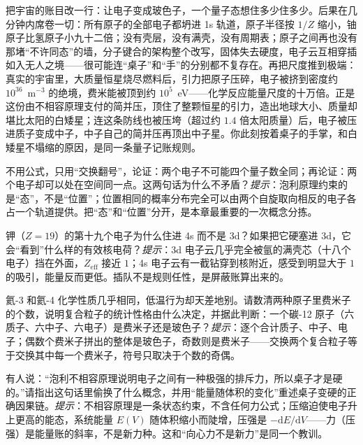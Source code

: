 
\begin{thought}[如果电子是玻色子]
把宇宙的账目改一行：让电子变成玻色子，一个量子态想住多少住多少。后果在几分钟内席卷一切：所有原子的全部电子都坍进 1s 轨道，原子半径按 \(1/Z\) 缩小，铀原子比氢原子小九十二倍；没有壳层，没有满壳，没有周期表；原子之间再也没有那堵“不许同态”的墙，分子键合的架构整个改写，固体失去硬度，电子云互相穿插如入无人之境——很可能连“桌子”和“手”的分别都不复存在。再把尺度推到极端：真实的宇宙里，大质量恒星烧尽燃料后，引力把原子压碎，电子被挤到密度约 \(10^{36}\)~m\(^{-3}\) 的绝境，费米能被顶到约 \(10^5\)~eV——化学反应能量尺度的十万倍。正是这份由不相容原理支付的简并压，顶住了整颗恒星的引力，造出地球大小、质量却堪比太阳的白矮星；连这条防线也被压垮（超过约 \(1.4\) 倍太阳质量）后，电子被压进质子变成中子，中子自己的简并压再顶出中子星。你此刻按着桌子的手掌，和白矮星不塌缩的原因，是同一条量子记账规则。
\end{thought}

\begin{puzzles}
\item 不用公式，只用“交换翻号”，论证：两个电子不可能四个量子数全同；再论证：两个电子却可以处在空间同一点。这两句话为什么不矛盾？\emph{提示}：泡利原理约束的是“态”，不是“位置”；位置相同的概率分布完全可以由两个自旋取向相反的电子各占一个轨道提供。把“态”和“位置”分开，是本章最重要的一次概念分拣。
\item 钾（\(Z=19\)）的第十九个电子为什么住进 4s 而不是 3d？如果把它硬塞进 3d，它会“看到”什么样的有效核电荷？\emph{提示}：3d 电子云几乎完全被氩的满壳芯（十八个电子）挡在外面，\(Z_{\mathrm{eff}}\) 接近 \(1\)；4s 电子云有一截钻穿到核附近，感受到明显大于 \(1\) 的吸引，能量反而更低。插队不是规则任性，是屏蔽账算出来的。
\item 氦-3 和氦-4 化学性质几乎相同，低温行为却天差地别。请数清两种原子里费米子的个数，说明复合粒子的统计性格由什么决定，并据此判断：一个碳-12 原子（六质子、六中子、六电子）是费米子还是玻色子？\emph{提示}：逐个合计质子、中子、电子；偶数个费米子拼出的整体是玻色子，奇数则是费米子——交换两个复合粒子等于交换其中每一个费米子，符号只取决于个数的奇偶。
\item 有人说：“泡利不相容原理说明电子之间有一种极强的排斥力，所以桌子才是硬的。”请指出这句话里偷换了什么概念，并用“能量随体积的变化”重述桌子变硬的正确因果链。\emph{提示}：不相容原理是一条状态约束，不含任何力公式；压缩迫使电子升上更高的能态，系统能量 \(E(V)\) 随体积缩小而陡增，压强是 \(-\mathrm dE/\mathrm dV\)——力（压强）是能量账的斜率，不是新力种。这和“向心力不是新力”是同一个教训。
\end{puzzles}
